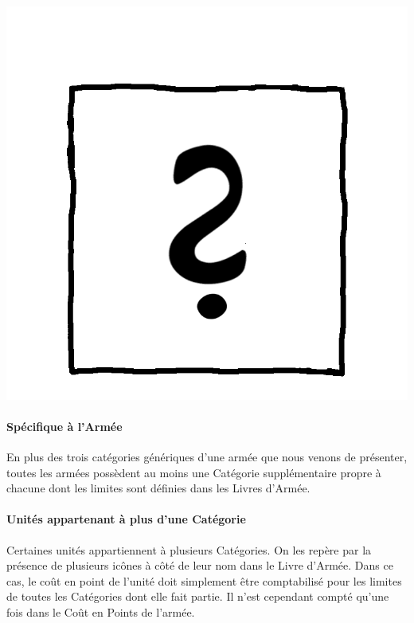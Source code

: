\begin{minipage}[c]{0.17\textwidth}
\includegraphics[width=\textwidth]{../Layout/pics/logo_specific.png}
\end{minipage}\hfill
\begin{minipage}[c]{0.80\textwidth}
\paragraph{Spécifique à l'Armée}

En plus des trois catégories génériques d'une armée que nous venons de présenter, toutes les armées possèdent au moins une Catégorie supplémentaire propre à chacune dont les limites sont définies dans les Livres d'Armée.
\end{minipage}

\newpage
\paragraph{Unités appartenant à plus d'une Catégorie}

Certaines unités appartiennent à plusieurs Catégories. On les repère par la présence de plusieurs icônes à côté de leur nom dans le Livre d'Armée. Dans ce cas, le coût en point de l'unité doit simplement être comptabilisé pour les limites de toutes les Catégories dont elle fait partie. Il n'est cependant compté qu'une fois dans le Coût en Points de l'armée.

